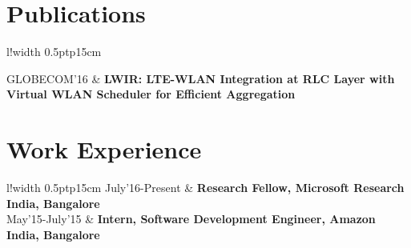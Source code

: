 \documentclass[10pt]{article}
\newcommand\VRule{\color{lightgray}\vrule width 0.5pt}
\begin{document}
\section*{Publications}
\begin{tabular}{l!{\VRule}p{15cm}}

GLOBECOM'16 & {\bf LWIR: LTE-WLAN Integration at RLC Layer with Virtual WLAN Scheduler for Efficient Aggregation } \\
\end{tabular}

\section*{Work Experience}
\begin{tabular}{l!{\VRule}p{15cm}}
July'16-Present & {\bf Research Fellow, Microsoft Research India, Bangalore } \\
May'15-July'15 & {\bf Intern, Software Development Engineer, Amazon India, Bangalore } \\
\end{tabular}
\end{document}
